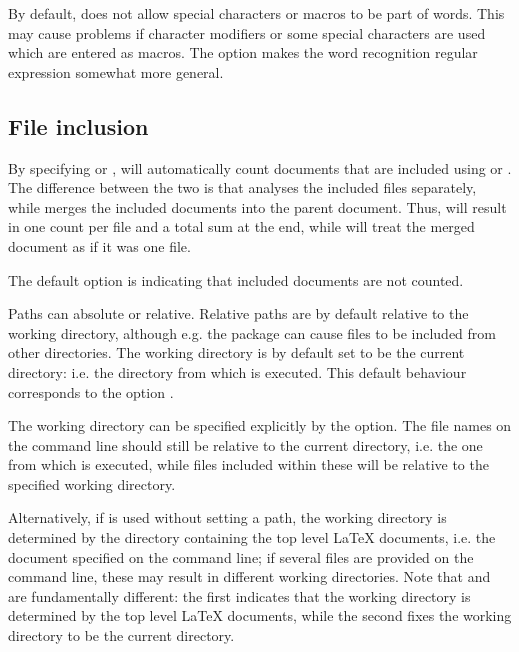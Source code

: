 \documentclass{article}
\begin{document}
By default, \TeXcount{} does not allow special characters or macros to be part of words. This may cause problems if character modifiers or some special characters are used which are entered as macros. The  option makes the word recognition regular expression somewhat more general.


\subsection{File inclusion}

By specifying  or , \TeXcount{} will automatically count documents that are included using  or . The difference between the two is that  analyses the included files separately, while  merges the included documents into the parent document. Thus,  will result in one count per file and a total sum at the end, while  will treat the merged document as if it was one file.

The default option is  indicating that included documents are not counted.

Paths can absolute or relative. Relative paths are by default relative to the working directory, although e.g. the  package can cause files to be included from other directories. The working directory is by default set to be the current directory: i.e. the directory from which \TeXcount{} is executed. This default behaviour corresponds to the option .

The working directory can be specified explicitly by the  option. The file names on the command line should still be relative to the current directory, i.e. the one from which \TeXcount{} is executed, while files included within these will be relative to the specified working directory.

Alternatively, if  is used without setting a path, the working directory is determined by the directory containing the top level \LaTeX{} documents, i.e. the document specified on the command line; if several files are provided on the command line, these may result in different working directories. Note that  and  are fundamentally different: the first indicates that the working directory is determined by the top level \LaTeX{} documents, while the second fixes the working directory to be the current directory.
\end{document}
